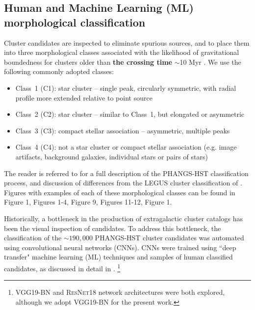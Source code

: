 \documentclass[linenumbers]{aastex63}
\begin{document}
\subsection{Human and Machine Learning (ML) morphological classification}\label{ssec:classification}
Cluster candidates are inspected to eliminate spurious sources, and to place them into three morphological classes associated
with the likelihood of gravitational boundedness for clusters older than \textbf{the crossing time} $\sim$10 Myr \citep{whitmore_antennae_2010, gieles_distinction_2011, bastian_stellar_2012, fall_similarities_2012, chandar_star-cluster_2014, grasha_spatial_2015, adamo_legacy_2017, krumholz_star_2019, cook_star_2019, wei_deep_2020}.  We use the following commonly adopted classes:
\begin{itemize}
    \item Class~1 (C1): star cluster -- single peak, circularly symmetric, with radial profile more extended relative to point source
    \item Class~2 (C2): star cluster -- similar to Class~1, but elongated or asymmetric 
    \item Class~3 (C3): compact stellar association -- asymmetric, multiple peaks %
    \item Class~4 (C4): not a star cluster or compact stellar association (e.g. image artifacts, background galaxies, individual stars or pairs of stars) 
\end{itemize}
The reader is referred to \citet{whitmore_star_2021} for a full description of the PHANGS-HST classification process, and discussion of differences from the LEGUS cluster classification of \citet{adamo_legacy_2017}.  Figures with examples of each of these morphological classes can be found in \citet{wei_deep_2020} Figure 1, \citet{whitmore_star_2021} Figures 1-4, \citet{lee_phangs-hst_2022} Figure 9, \citet{deger_bright_2022} Figures 11-12, \citet{hannon_star_2023} Figure 1.

Historically, a bottleneck in the production of extragalactic cluster catalogs has been the visual inspection of candidates.
To address this bottleneck, the classification of the $\sim190,000$ PHANGS-HST cluster candidates was automated using convolutional neural networks (CNNs).  CNNs were trained using ``deep transfer" machine learning (ML) techniques and samples of human classified candidates, as discussed in detail in \cite{wei_deep_2020, whitmore_star_2021, hannon_star_2023}. \footnote{\textsc{VGG19-BN} \citep{simonyan_very_2015} and \textsc{ResNet18} \citep{he_deep_2015} network architectures were both explored, although we adopt \textsc{VGG19-BN} for the present work.}
\end{document}
